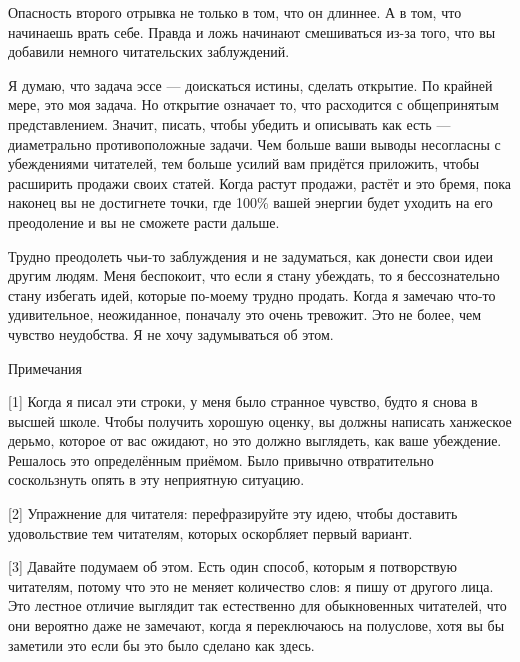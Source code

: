 \documentclass[ebook,12pt,oneside,openany]{memoir}
\begin{document}
Опасность второго отрывка не только в том, что он длиннее. А в том,
что начинаешь врать себе. Правда и ложь начинают смешиваться из-за
того, что вы добавили немного читательских заблуждений.

Я думаю, что задача эссе — доискаться истины, сделать открытие. По
крайней мере, это моя задача. Но открытие означает то, что расходится
с общепринятым представлением. Значит, писать, чтобы убедить и
описывать как есть — диаметрально противоположные задачи. Чем больше
ваши выводы несогласны с убеждениями читателей, тем больше усилий вам
придётся приложить, чтобы расширить продажи своих статей. Когда растут
продажи, растёт и это бремя, пока наконец вы не достигнете точки, где
100\% вашей энергии будет уходить на его преодоление и вы не сможете
расти дальше.

Трудно преодолеть чьи-то заблуждения и не задуматься, как донести свои
идеи другим людям. Меня беспокоит, что если я стану убеждать, то я
бессознательно стану избегать идей, которые по-моему трудно продать.
Когда я замечаю что-то удивительное, неожиданное, поначалу это очень
тревожит. Это не более, чем чувство неудобства. Я не хочу задумываться
об этом.

Примечания

[1] Когда я писал эти строки, у меня было странное чувство, будто я
снова в высшей школе. Чтобы получить хорошую оценку, вы должны
написать ханжеское дерьмо, которое от вас ожидают, но это должно
выглядеть, как ваше убеждение. Решалось это определённым приёмом. Было
привычно отвратительно соскользнуть опять в эту неприятную ситуацию.

[2] Упражнение для читателя: перефразируйте эту идею, чтобы доставить
удовольствие тем читателям, которых оскорбляет первый вариант.

[3] Давайте подумаем об этом. Есть один способ, которым я потворствую
читателям, потому что это не меняет количество слов: я пишу от другого
лица. Это лестное отличие выглядит так естественно для обыкновенных
читателей, что они вероятно даже не замечают, когда я переключаюсь на
полуслове, хотя вы бы заметили это если бы это было сделано как здесь.
\end{document}
